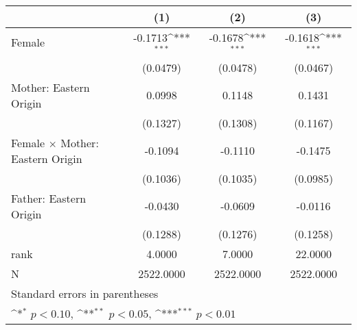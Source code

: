 {
\def\sym#1{\ifmmode^{#1}\else\(^{#1}\)\fi}
\begin{tabular}{l*{3}{c}}
\toprule
                    &\multicolumn{1}{c}{(1)}         &\multicolumn{1}{c}{(2)}         &\multicolumn{1}{c}{(3)}         \\
\midrule
Female              &     -0.1713\sym{***}&     -0.1678\sym{***}&     -0.1618\sym{***}\\
                    &    (0.0479)         &    (0.0478)         &    (0.0467)         \\
\addlinespace
Mother: Eastern Origin&      0.0998         &      0.1148         &      0.1431         \\
                    &    (0.1327)         &    (0.1308)         &    (0.1167)         \\
\addlinespace
Female $\times$ Mother: Eastern Origin&     -0.1094         &     -0.1110         &     -0.1475         \\
                    &    (0.1036)         &    (0.1035)         &    (0.0985)         \\
\addlinespace
Father: Eastern Origin&     -0.0430         &     -0.0609         &     -0.0116         \\
                    &    (0.1288)         &    (0.1276)         &    (0.1258)         \\
\midrule
rank                &      4.0000         &      7.0000         &     22.0000         \\
N                   &   2522.0000         &   2522.0000         &   2522.0000         \\
\bottomrule
\multicolumn{4}{l}{\footnotesize Standard errors in parentheses}\\
\multicolumn{4}{l}{\footnotesize \sym{*} \(p<0.10\), \sym{**} \(p<0.05\), \sym{***} \(p<0.01\)}\\
\end{tabular}
}

